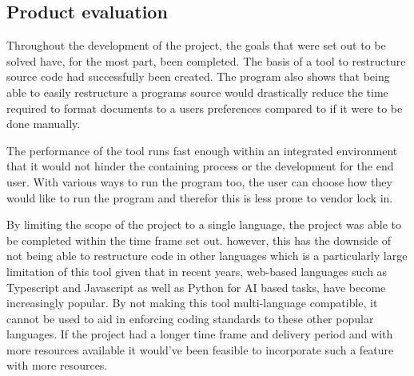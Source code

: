 
\subsection{Product evaluation}

Throughout the development of the project, the goals that were set out to be solved have, for the most part, been completed. The basis of a tool to restructure source code had successfully been created. The program also shows that being able to easily restructure a programs source would drastically reduce the time required to format documents to a users preferences compared to if it were to be done manually.

The performance of the tool runs fast enough within an integrated environment that it would not hinder the containing process or the development for the end user.
With various ways to run the program too, the user can choose how they would like to run the program and therefor this is less prone to vendor lock in.

By limiting the scope of the project to a single language, the project was able to be completed within the time frame set out. however, this has the downside of not being able to restructure code in other languages which is a particularly large limitation of this tool given that in recent years, web-based languages such as Typescript and Javascript as well as Python for AI based tasks, have become increasingly popular. By not making this tool multi-language compatible, it cannot be used to aid in enforcing coding standards to these other popular languages. If the project had a longer time frame and delivery period and with more resources available it would've been feasible to incorporate such a feature with more resources.
